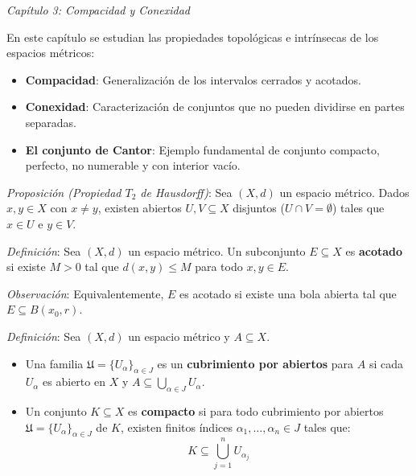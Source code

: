 \documentclass{beamer}
\begin{document}
  \begin{frame}
    \textit{Capítulo 3: Compacidad y Conexidad}
    \newline\newline

    En este capítulo se estudian las propiedades topológicas e intrínsecas de los espacios métricos:
    \newline
    \begin{itemize}[<+->]
      \item \textbf{Compacidad}: Generalización de los intervalos cerrados y acotados.
      \item \textbf{Conexidad}: Caracterización de conjuntos que no pueden dividirse en partes separadas.
      \item \textbf{El conjunto de Cantor}: Ejemplo fundamental de conjunto compacto, perfecto, no numerable y con interior vacío.
    \end{itemize}
  \end{frame}

  \begin{frame}
    \textit{Proposición (Propiedad $T_2$ de Hausdorff)}: Sea $(X, d)$ un espacio métrico. Dados $x, y \in X$ con $x \neq y$, existen abiertos $U, V \subseteq X$ disjuntos ($U \cap V = \emptyset$) tales que $x \in U$ e $y \in V$.
    \newline\newline

    \pause
    \textit{Definición}: Sea $(X, d)$ un espacio métrico. Un subconjunto $E \subseteq X$ es \textbf{acotado} si existe $M > 0$ tal que $d(x, y) \leq M$ para todo $x, y \in E$.
    \newline\newline

    \pause
    \textit{Observación}: Equivalentemente, $E$ es acotado si existe una bola abierta tal que $E \subseteq B(x_0, r)$.
  \end{frame}

  \begin{frame}
    \textit{Definición}: Sea $(X, d)$ un espacio métrico y $A \subseteq X$.
    \newline

    \begin{itemize}[<+->]
      \item Una familia $\mathfrak{U} = \{U_\alpha\}_{\alpha \in J}$ es un \textbf{cubrimiento por abiertos} para $A$ si cada $U_\alpha$ es abierto en $X$ y $A \subseteq \bigcup_{\alpha \in J} U_\alpha$.
      \item Un conjunto $K \subseteq X$ es \textbf{compacto} si para todo cubrimiento por abiertos $\mathfrak{U} = \{U_\alpha\}_{\alpha \in J}$ de $K$, existen finitos índices $\alpha_1, \dots, \alpha_n \in J$ tales que:
            \[ K \subseteq \bigcup_{j=1}^n U_{\alpha_j} \]
    \end{itemize}
  \end{frame}
\end{document}
